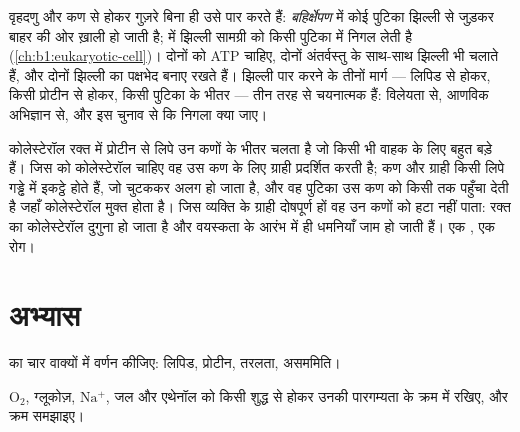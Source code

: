 \begin{proposition}[पुटिकीय अभिगमन]\label{prop:b1:membranes-transport:vesicles}
वृहदणु और कण  से होकर गुज़रे बिना ही उसे पार करते हैं:
\emph{बहिर्क्षेपण} में कोई पुटिका झिल्ली से जुड़कर बाहर की ओर ख़ाली हो
जाती है; \emph{} में झिल्ली सामग्री को किसी पुटिका में निगल
लेती है (\cref{ch:b1:eukaryotic-cell})। दोनों को ATP चाहिए, दोनों
अंतर्वस्तु के साथ-साथ झिल्ली भी चलाते हैं, और दोनों झिल्ली का पक्षभेद
बनाए रखते हैं। झिल्ली पार करने के तीनों मार्ग --- लिपिड से होकर, किसी
प्रोटीन से होकर, किसी पुटिका के भीतर --- तीन तरह से चयनात्मक हैं:
विलेयता से, आणविक अभिज्ञान से, और इस चुनाव से कि निगला क्या जाए।
\end{proposition}

\begin{example}[कोलेस्टेरॉल की आपूर्ति]\label{ex:b1:membranes-transport:ldl}
कोलेस्टेरॉल रक्त में प्रोटीन से लिपे उन कणों के भीतर चलता है जो किसी भी
वाहक के लिए बहुत बड़े हैं। जिस  को कोलेस्टेरॉल चाहिए वह उस कण के
लिए ग्राही प्रदर्शित करती है; कण और ग्राही किसी लिपे गड्ढे में इकट्ठे
होते हैं, जो चुटककर अलग हो जाता है, और वह पुटिका उस कण को किसी 
तक पहुँचा देती है जहाँ कोलेस्टेरॉल मुक्त होता है। जिस व्यक्ति के ग्राही
दोषपूर्ण हों वह उन कणों को हटा नहीं पाता: रक्त का कोलेस्टेरॉल दुगुना हो
जाता है और वयस्कता के आरंभ में ही धमनियाँ जाम हो जाती हैं। एक , एक रोग।
\end{example}

\section{अभ्यास}

\begin{exercise}[$\star$]\label{exo:b1:membranes-transport:1}
 का चार वाक्यों में वर्णन कीजिए: लिपिड, प्रोटीन, तरलता,
असममिति।
\end{exercise}

\begin{exercise}[$\star$]\label{exo:b1:membranes-transport:2}
$\mathrm{O_2}$, ग्लूकोज़, $\mathrm{Na^+}$, जल और एथेनॉल को किसी शुद्ध
 से होकर उनकी पारगम्यता के क्रम में रखिए, और क्रम समझाइए।
\end{exercise}

